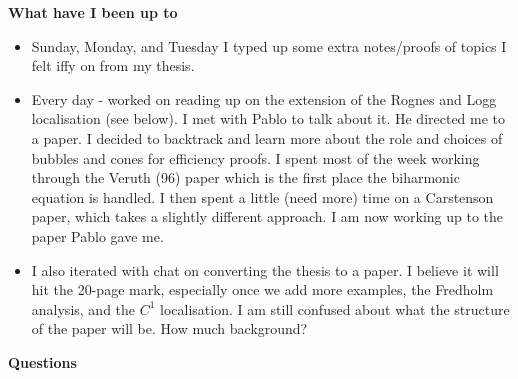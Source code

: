 \documentclass[12pt,a4paper]{article}
\begin{document}
\textbf{What have I been up to}

\begin{itemize}
    \item Sunday, Monday, and Tuesday I typed up some extra notes/proofs of topics I felt iffy on from my thesis. 
    \item Every day - worked on reading up on the extension of the Rognes and Logg localisation (see below). I met with Pablo to talk about it. He directed me to a paper. I decided to backtrack and learn more about the role and choices of bubbles and cones for efficiency proofs. I spent most of the week working through the Veruth (96) paper which is the first place the biharmonic equation is handled. I then spent a little (need more) time on a Carstenson paper, which takes a slightly different approach. I am now working up to the paper Pablo gave me.
    \item I also iterated with chat on converting the thesis to a paper. I believe it will hit the 20-page mark, especially once we add more examples, the Fredholm analysis, and the $C^1$ localisation. I am still confused about what the structure of the paper will be. How much background? 
\end{itemize}

\textbf{Questions}
\end{document}
